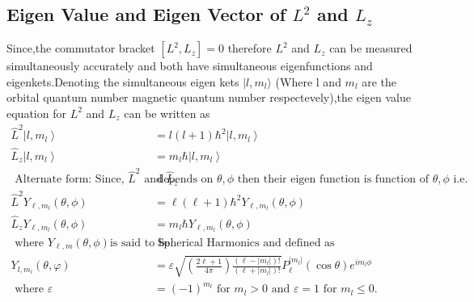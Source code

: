 \subsection{Eigen Value and Eigen Vector of $L^2$ and $L_z$}
Since,the commutator bracket $\left[ L^2,L_z\right] =0$ therefore $L^2$ and $L_z$ can be measured simultaneously accurately and both have simultaneous eigenfunctions and eigenkets.Denoting the simultaneous eigen kets $|l,m_l\rangle $ (Where l and $m_l$ are the orbital quantum number magnetic quantum number respectevely),the eigen value equation for $L^2$ and $L_z$ can be written as 
\begin{align*}
\hat{L}^{2}\left|l, m_{l}\right\rangle&=l(l+1) \hbar^{2}\left|l, m_{l}\right\rangle \\
\hat{L}_{z}\left|l, m_{l}\right\rangle&=m_{l} \hbar\left|l, m_{l}\right\rangle\\
\text { Alternate form: Since, } \hat{L}^{2} \text { and } \hat{L}_{z} &\text { depends on } \theta, \phi \text { then their eigen function is function of } \theta, \phi \text { i.e. }\\
\hat{L}^{2} Y_{\ell, m_{l}}(\theta, \phi)&=\ell(\ell+1) \hbar^{2} Y_{\ell, m_{l}}(\theta, \phi) \\
\hat{L}_{z} Y_{\ell, m_{l}}(\theta, \phi)&=m_{l} \hbar Y_{\ell, m_{l}}(\theta, \phi)\\
\text { where } Y_{\ell, m}(\theta, \phi) \text{is said to be}&\text {  Spherical Harmonics and defined as }\\
Y_{l, m_{l}}(\theta, \varphi)&=\varepsilon \sqrt{\left(\frac{2 \ell+1}{4 \pi}\right) \frac{\left(\ell-\left|m_{l}\right|\right) !}{\left(\ell+\left|m_{l}\right|\right) !}} P_{\ell}^{\left|m_{l}\right|}(\cos \theta) e^{i m_{l} \phi}\\
\text { where } \varepsilon&=(-1)^{m_{l}} \text { for } m_{l}>0 \text { and } \varepsilon=1 \text { for } m_{l} \leq 0 \text {. }
\end{align*}
